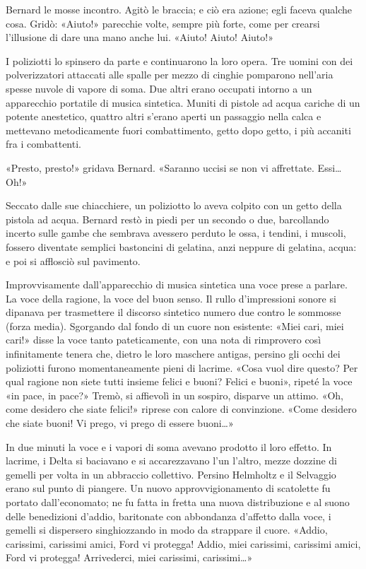 \documentclass[
a5paper, %
10pt, %
twoside, 
onecolumn, %
openany, %
]{memoir}
\begin{document}
Bernard le mosse incontro. Agitò le braccia; e ciò era azione; egli faceva qualche cosa. Gridò: «Aiuto!» parecchie volte, sempre più forte, come per crearsi l’illusione di dare una mano anche lui. «Aiuto! Aiuto! Aiuto!»

I poliziotti lo spinsero da parte e continuarono la loro opera. Tre uomini con dei polverizzatori attaccati alle spalle per mezzo di cinghie pomparono nell’aria spesse nuvole di vapore di soma. Due altri erano occupati intorno a un apparecchio portatile di musica sintetica. Muniti di pistole ad acqua cariche di un potente anestetico, quattro altri s’erano aperti un passaggio nella calca e mettevano metodicamente fuori combattimento, getto dopo getto, i più accaniti fra i combattenti.

«Presto, presto!» gridava Bernard. «Saranno uccisi se non vi affrettate. Essi… Oh!»

Seccato dalle sue chiacchiere, un poliziotto lo aveva colpito con un getto della pistola ad acqua. Bernard restò in piedi per un secondo o due, barcollando incerto sulle gambe che sembrava avessero perduto le ossa, i tendini, i muscoli, fossero diventate semplici bastoncini di gelatina, anzi neppure di gelatina, acqua: e poi si afflosciò sul pavimento.

Improvvisamente dall’apparecchio di musica sintetica una voce prese a parlare. La voce della ragione, la voce del buon senso. Il rullo d’impressioni sonore si dipanava per trasmettere il discorso sintetico numero due contro le sommosse (forza media). Sgorgando dal fondo di un cuore non esistente: «Miei cari, miei cari!» disse la voce tanto pateticamente, con una nota di rimprovero così infinitamente tenera che, dietro le loro maschere antigas, persino gli occhi dei poliziotti furono momentaneamente pieni di lacrime. «Cosa vuol dire questo? Per qual ragione non siete tutti insieme felici e buoni? Felici e buoni», ripeté la voce «in pace, in pace?» Tremò, si affievolì in un sospiro, disparve un attimo. «Oh, come desidero che siate felici!» riprese con calore di convinzione. «Come desidero che siate buoni! Vi prego, vi prego di essere buoni…»

In due minuti la voce e i vapori di soma avevano prodotto il loro effetto. In lacrime, i Delta si baciavano e si accarezzavano l’un l’altro, mezze dozzine di gemelli per volta in un abbraccio collettivo. Persino Helmholtz e il Selvaggio erano sul punto di piangere. Un nuovo approvvigionamento di scatolette fu portato dall’economato; ne fu fatta in fretta una nuova distribuzione e al suono delle benedizioni d’addio, baritonate con abbondanza d’affetto dalla voce, i gemelli si dispersero singhiozzando in modo da strappare il cuore. «Addio, carissimi, carissimi amici, Ford vi protegga! Addio, miei carissimi, carissimi amici, Ford vi protegga! Arrivederci, miei carissimi, carissimi…»
\end{document}
